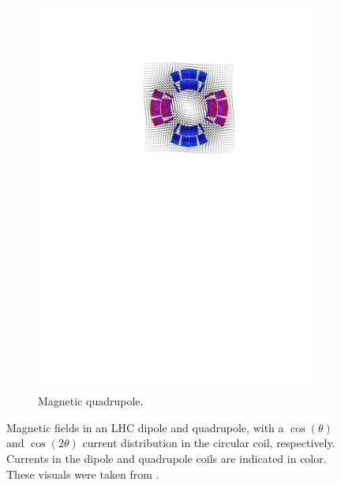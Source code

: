\begin{figure}[!hbt]
\begin{subfigure}[b]{0.495\textwidth}
    \end{subfigure}
    \hfill
    \begin{subfigure}[b]{0.485\textwidth}
        \centering
        \includegraphics[width=\textwidth]{Figures/Beam_Dynamics_Theory/lhc_cos2theta_quadrupole.pdf}
        \caption{Magnetic quadrupole.}
        \label{fig:magnetic_quadrupole}
    \end{subfigure}
    \caption{Magnetic fields in an LHC dipole and quadrupole, with a \(\cos(\theta)\) and \(\cos(2\theta)\) current distribution in the circular coil, respectively. Currents in the dipole and quadrupole coils are indicated in color. These visuals were taken from \cite{CERN:Russenschuck:CAS_Design_Magnets}.}
    \label{figure:dipole_quadrupole_fields}
\end{figure}

